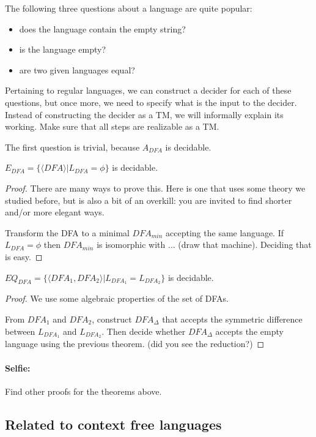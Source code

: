 The following three questions about a language are quite popular:
\begin{itemize}
\item does the language contain the empty string?
\item is the language empty?
\item are two given languages equal?
\end{itemize}

Pertaining to regular languages, we can construct a decider for each
of these questions, but once more, we need to specify what is the
input to the decider. Instead of constructing the decider as a TM, we
will informally explain its working. Make sure that all steps are
realizable as a TM.


The first question is trivial, because $A_{DFA}$ is decidable.

\begin{theorem}
$E_{DFA} = \{\langle DFA \rangle| L_{DFA} = \phi\}$ is decidable.
\end{theorem}
\begin{proof}
There are many ways to prove this. Here is one that uses some theory
we studied before, but is also a bit of an overkill: you are invited
to find shorter and/or more elegant ways.

Transform the DFA to a minimal $DFA_{min}$ accepting the same language.
If $L_{DFA} = \phi$ then $DFA_{min}$ is isomorphic with ... (draw that
machine). Deciding that is easy.
\end{proof}

\begin{theorem}
$EQ_{DFA} = \{\langle DFA_1,DFA_2 \rangle| L_{DFA_1} = L_{DFA_2}\}$ is decidable.
\end{theorem}
\begin{proof}
We use some algebraic properties of the set of DFAs.

From $DFA_1$ and $DFA_2$, construct $DFA_\Delta$ that accepts the
symmetric difference between $L_{DFA_1}$ and $L_{DFA_2}$. Then decide
whether $DFA_\Delta$ accepts the empty language using the previous
theorem. (did you see the reduction?)
\end{proof}


\paragraph{Selfie:} Find other proofs for the theorems above.


\subsection{Related to context free languages}

